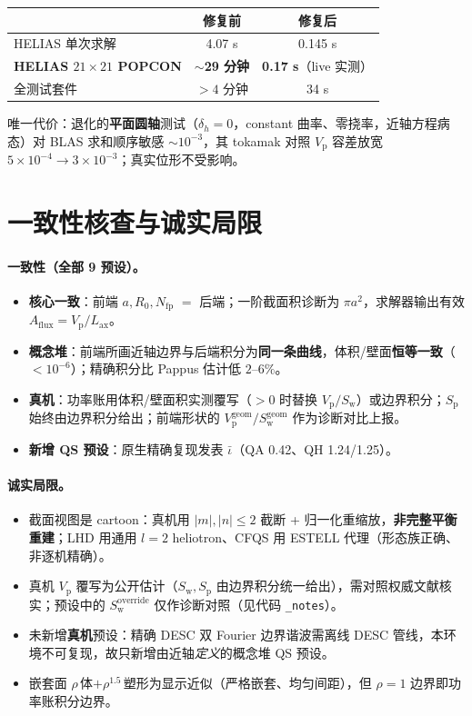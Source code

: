 \documentclass[UTF8,11pt]{ctexart}
\newcommand{\Vp}{V_\mathrm{p}}
\newcommand{\Sw}{S_\mathrm{w}}
\newcommand{\Sp}{S_\mathrm{p}}
\newcommand{\Aflux}{A_\mathrm{flux}}
\newcommand{\Lax}{L_\mathrm{ax}}
\newcommand{\nfp}{N_\mathrm{fp}}
\newcommand{\iotabar}{\bar{\iota}}
\begin{document}
\begin{center}
\renewcommand{\arraystretch}{1.25}
\begin{tabular}{@{}lcc@{}}
\toprule
 & 修复前 & 修复后 \\
\midrule
HELIAS 单次求解 & 4.07 s & 0.145 s \\
\textbf{HELIAS $21\times21$ POPCON} & \textbf{$\sim$29 分钟} & \textbf{0.17 s}（live 实测）\\
全测试套件 & $>4$ 分钟 & 34 s \\
\bottomrule
\end{tabular}
\end{center}
唯一代价：退化的\textbf{平面圆轴}测试（$\delta_h=0$，constant 曲率、零挠率，近轴方程病态）对 BLAS 求和顺序敏感 $\sim10^{-3}$，其 tokamak 对照 $\Vp$ 容差放宽 $5\!\times\!10^{-4}\to3\!\times\!10^{-3}$；真实位形不受影响。

\section{一致性核查与诚实局限}\label{sec:consistency}

\paragraph{一致性（全部 9 预设）。}
\begin{itemize}[leftmargin=1.4em]
\item \textbf{核心一致}：前端 $a,R_0,\nfp$ $=$ 后端；一阶截面积诊断为 $\pi a^2$，求解器输出有效 $\Aflux=\Vp/\Lax$。
\item \textbf{概念堆}：前端所画近轴边界与后端积分为\textbf{同一条曲线}，体积/壁面\textbf{恒等一致}（$<10^{-6}$）；精确积分比 Pappus 估计低 $2$--$6\%$。
\item \textbf{真机}：功率账用体积/壁面积实测覆写（$>0$ 时替换 $\Vp/\Sw$）或边界积分；$\Sp$ 始终由边界积分给出；前端形状的 $\Vp^{\mathrm{geom}}/\Sw^{\mathrm{geom}}$ 作为诊断对比上报。
\item \textbf{新增 QS 预设}：原生精确复现发表 $\iotabar$（QA 0.42、QH 1.24/1.25）。
\end{itemize}

\paragraph{诚实局限。}
\begin{itemize}[leftmargin=1.4em]
\item 截面视图是 cartoon：真机用 $|m|,|n|\le2$ 截断 + 归一化重缩放，\textbf{非完整平衡重建}；LHD 用通用 $l{=}2$ heliotron、CFQS 用 ESTELL 代理（形态族正确、非逐机精确）。
\item 真机 $\Vp$ 覆写为公开估计（$\Sw,\Sp$ 由边界积分统一给出），需对照权威文献核实；预设中的 $\Sw^\mathrm{override}$ 仅作诊断对照（见代码 \texttt{\_notes}）。
\item 未新增\textbf{真机}预设：精确 DESC 双 Fourier 边界谐波需离线 DESC 管线，本环境不可复现，故只新增由近轴\emph{定义}的概念堆 QS 预设。
\item 嵌套面 $\rho\,$体$+\rho^{1.5}\,$塑形为显示近似（严格嵌套、均匀间距），但 $\rho{=}1$ 边界即功率账积分边界。
\end{itemize}
\end{document}

